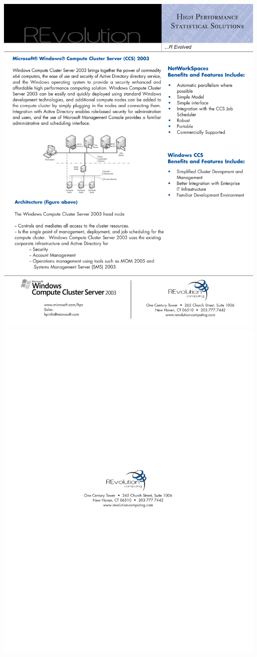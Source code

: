\documentclass{asaproc}
\begin{document}
  \includegraphics*{MicrosoftWindowsClusterComputeServer2003.pdf}
  \includegraphics*{RevolutionComputingInfo.pdf}
\end{document}
